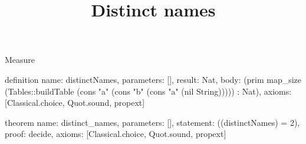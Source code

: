 \begin{lexlean}{Measure}
\title{Distinct names}
\begin{semanticmodule}
definition{
  name: distinctNames,
  parameters: [],
  result: Nat,
  body: (prim map_size (Tables::buildTable (cons "a" (cons "b" (cons "a" (nil String))))) : Nat),
  axioms: [Classical.choice, Quot.sound, propext]
}

theorem{
  name: distinct_names,
  parameters: [],
  statement: ((distinctNames) = 2),
  proof: decide{},
  axioms: [Classical.choice, Quot.sound, propext]
}
\end{semanticmodule}
\end{lexlean}
